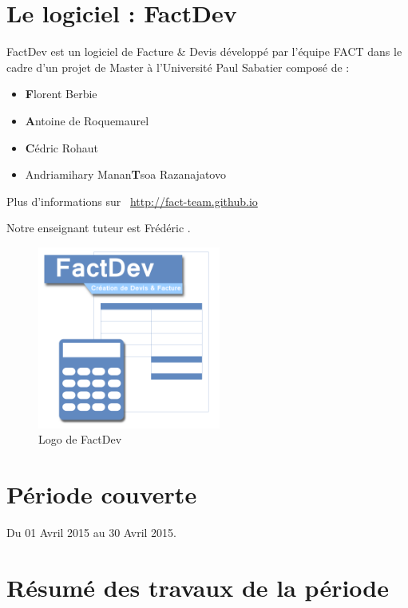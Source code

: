 \documentclass[12pt,a4paper,openany]{article}
\begin{document}
	\thispagestyle{empty} %
	\titleBC 
	\newpage
	\setcounter{tocdepth}{1}
	\setcounter{secnumdepth}{3}
	
	\tableofcontents
	\newpage
	\section{Le logiciel : FactDev}
	FactDev est un logiciel de Facture \& Devis développé par l'équipe FACT dans le cadre d'un projet de Master à l'Université Paul Sabatier composé de : 
	\begin{itemize}
		\item \textbf{F}lorent Berbie
		\item \textbf{A}ntoine de Roquemaurel
		\item \textbf{C}édric Rohaut
		\item Andriamihary Manan\textbf{T}soa Razanajatovo
	\end{itemize}

	Plus d’informations sur \Mundus~\url{http://fact-team.github.io}

	Notre enseignant tuteur est Frédéric .

	\begin{figure}[H]
		\centering
		\includegraphics[width=6cm]{../FACTDev.png}
		\caption{Logo de FactDev}
	\end{figure}

 	\section{Période couverte}
	Du 01 Avril 2015 au 30 Avril 2015.

	\section{Résumé des travaux de la période}
\end{document}
